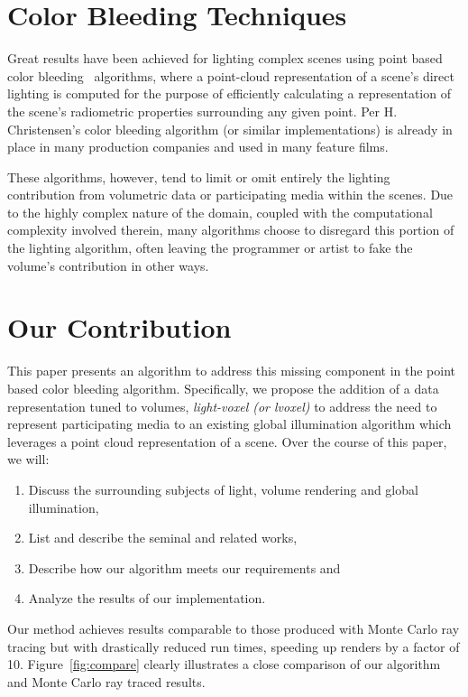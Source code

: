 \documentclass[12pt]{ucthesis}
\begin{document}
\section{Color Bleeding Techniques}

Great results have been achieved for lighting complex scenes using point based color bleeding~\cite{christensen:2008} algorithms, where a point-cloud representation of a scene's direct lighting is computed for the purpose of efficiently calculating a representation of the scene's radiometric properties surrounding any given point.  Per H. Christensen's color bleeding algorithm (or similar implementations) is already in place in many production companies and used in many feature films.

These algorithms, however, tend to limit or omit entirely the lighting contribution from volumetric data or participating media within the scenes.  Due to the highly complex nature of the domain, coupled with the computational complexity involved therein, many algorithms choose to disregard this portion of the lighting algorithm, often leaving the programmer or artist to fake the volume's contribution in other ways.


\section{Our Contribution}

This paper presents an algorithm to address this missing component in the point based color bleeding algorithm.  Specifically, we propose the addition of a data representation tuned to volumes,  \emph{light-voxel (or lvoxel)} to address the need to represent participating media to an existing global illumination algorithm which leverages a point cloud representation of a scene.  Over the course of this paper, we will:

\begin{enumerate}
\item Discuss the surrounding subjects of light, volume rendering and global illumination,
\item List and describe the seminal and related works,
\item Describe how our algorithm meets our requirements and
\item Analyze the results of our implementation.
\end{enumerate}

Our method achieves results comparable to those produced with Monte Carlo ray tracing but with drastically reduced run times, speeding up renders by a factor of 10.  Figure~\ref{fig:compare} clearly illustrates a close comparison of our algorithm and Monte Carlo ray traced results.
\end{document}
